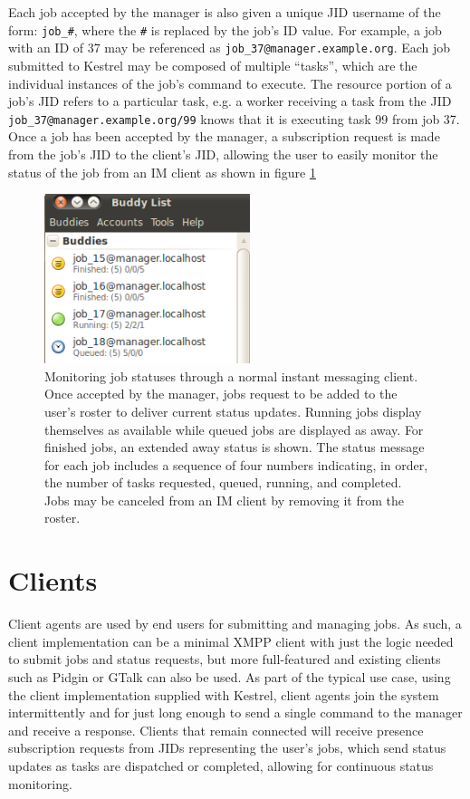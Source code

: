 Each job accepted by the manager is also given a unique JID username of
the form: \texttt{job\_\#}, where the \texttt{\#} is replaced by the
job's ID value. For example, a job with an ID of 37 may be referenced as
\texttt{job\_37@manager.example.org}. Each job submitted to Kestrel may
be composed of multiple ``tasks'', which are the individual instances
of the job's command to execute. The resource portion of a job's JID
refers to a particular task, e.g. a worker receiving a task from the JID
\texttt{job\_37@manager.example.org/99} knows that it is executing task 99 from
job 37. Once a job has been accepted by the manager, a subscription request is
made from the job's JID to the client's JID, allowing the user to easily monitor
the status of the job from an IM client as shown in figure \ref{fig:IM-Client}

\begin{figure}
\begin{center}
\includegraphics[width=6cm]{figures/im_client}
\end{center}
\caption{\label{fig:IM-Client} Monitoring job statuses through a normal instant
messaging client. Once accepted by the manager, jobs request to be
added to the user's roster to deliver current status updates. Running
jobs display themselves as available while queued jobs are displayed
as away. For finished jobs, an extended away status is shown. The
status message for each job includes a sequence of four numbers indicating,
in order, the number of tasks requested, queued, running, and completed.
Jobs may be canceled from an IM client by removing it from the roster.}
\end{figure}

\section{Clients}
Client agents are used by end users for submitting and managing jobs. As such,
a client implementation can be a minimal XMPP client with just the logic needed
to submit jobs and status requests, but more full-featured and existing clients
such as Pidgin \cite{Pidgin} or GTalk \cite{GTalk} can also be used. As part of
the typical use case, using the client implementation supplied with Kestrel,
client agents join the system intermittently and for just long enough to send a
single command to the manager and receive a response. Clients that remain connected
will receive presence subscription requests from JIDs representing the user's jobs,
which send status updates as tasks are dispatched or completed, allowing for 
continuous status monitoring.

